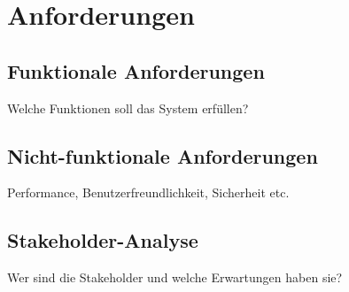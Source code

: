 \chapter{Anforderungen}

\section{Funktionale Anforderungen}
Welche Funktionen soll das System erfüllen?
\section{Nicht-funktionale Anforderungen}
Performance, Benutzerfreundlichkeit, Sicherheit etc.

\section{Stakeholder-Analyse}
Wer sind die Stakeholder und welche Erwartungen haben sie?